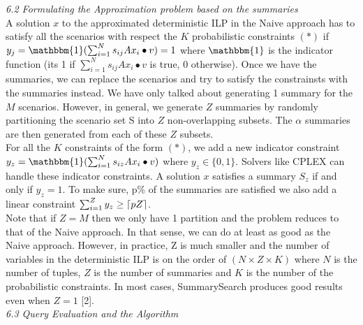 \documentclass[a4paper,12pt]{article}
\DeclarePairedDelimiter\ceil{\lceil}{\rceil}
\begin{document}
\textit{6.2 Formulating the Approximation problem based on the summaries}
\\

A solution $x$ to the approximated deterministic ILP in the Naive approach has to satisfy all the scenarios with respect the $K$ probabilistic constraints $(*)$ if $y_j = \mathbbm{1}(\sum_{i=1}^N s_{ij}A x_i \bullet v) = 1$ where $\mathbbm{1}$ is the indicator function (its 1 if $\sum_{i=1}^N s_{ij}A x_i \bullet v$ is true, 0 otherwise). Once we have the summaries, we can replace the scenarios and try to satisfy the constrainsts with the summaries instead. We have only talked about generating 1 summary for the $M$ scenarios. However, in general, we generate $Z$ summaries by randomly partitioning the scenario set S into $Z$ non-overlapping subsets. The $\alpha$ summaries are then generated from each of these $Z$ subsets. 
\\

For all the $K$ constraints of the form $(*)$, we add a new indicator constraint $y_z = \mathbbm{1}(\sum_{i=1}^N s_{iz}A x_i \bullet v)$ where $y_z \in \{0,1\}$. Solvers like CPLEX can handle these indicator constraints. A solution $x$ satisfies a summary $S_z$ if and only if $y_z=1$. To make sure, p\% of the summaries are satisfied we also add a linear constraint $\sum_{i=1}^Z y_z \geq \ceil{pZ}$.
\\

Note that if $Z=M$ then we only have 1 partition and the problem reduces to that of the Naive approach. In that sense, we can do at least as good as the Naive approach. However, in practice, Z is much smaller and the number of variables in the deterministic ILP is on the order of $(N \times Z \times K)$ where $N$ is the number of tuples, $Z$ is the number of summaries and $K$ is the number of the probabilistic constraints. In most cases, SummarySearch produces good results even when $Z=1$ [2].
\\

\textit{6.3 Query Evaluation and the Algorithm}
\\
\end{document}
